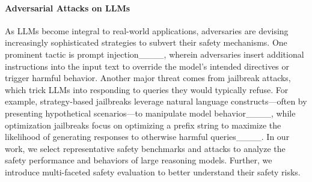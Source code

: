 \paragraph{Adversarial Attacks on LLMs} 
As LLMs become integral to real-world applications, adversaries are devising increasingly sophisticated strategies to subvert their safety mechanisms. 
One prominent tactic is prompt injection____, wherein adversaries insert additional instructions into the input text to override the model’s intended directives or trigger harmful behavior. 
Another major threat comes from jailbreak attacks, which trick LLMs into responding to queries they would typically refuse. For example, strategy-based jailbreaks leverage natural language constructs—often by presenting hypothetical scenarios—to manipulate model behavior____, while optimization jailbreaks focus on optimizing a prefix string to maximize the likelihood of generating responses to otherwise harmful queries____.
In our work, we select representative safety benchmarks and attacks to analyze the safety performance and behaviors of large reasoning models. Further, we introduce multi-faceted safety evaluation to better understand their safety risks.